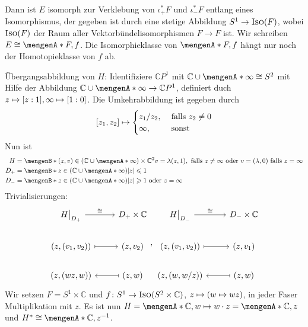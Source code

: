 Dann ist $E$ isomorph zur Verklebung von $\iota_+^*F$ und $\iota_-^* F$ entlang eines Isomorphismus, der gegeben ist durch eine stetige Abbildung $S^1 \to \textsc{Iso}(F)$, 
wobei $\textsc{Iso}(F)$ der Raum aller Vektorbündelisomorphismen $F \to F$ ist. Wir schreiben $E \cong \set{F,f}$. Die Isomorphieklasse von $\set{F,f}$ hängt nur noch der 
Homotopieklasse von $f$ ab.

Übergangsabbildung von $H$: Identifiziere $\mathds{C}P^1$ mit $\mathds{C} \cup \set{\infty} \cong S^2 $ mit Hilfe der Abbildung 
$\mathds{C} \cup \set{\infty} \to \mathds{C}P^1 $, definiert duch $z \mapsto \benbrace*{z:1}, \infty \mapsto \benbrace*{1:0}$. Die Umkehrabbildung ist gegeben durch
\[
	\benbrace*{z_1,z_2} \mapsto \begin{cases}
		z_1/z_2, &\text{ falls }z_2 \not=0\\
		\infty , & \text{ sonst}
	\end{cases}
\]
Nun ist
\begin{align*}
	H &= \set[(z,v) \in (\mathds{C} \cup \set{\infty}) \times \mathds{C}^2]{v= \lambda(z,1), \text{ falls } z \not= \infty \text{ oder } v=(\lambda,0) \text{ falls } 
	z=\infty} \\
	D_+ &= \set[z \in (\mathds{C} \cup \set{\infty})]{\abs*{z} \le 1 } \\
	D_- &= \set[z \in (\mathds{C} \cup \set{\infty})]{ \abs*{z} \ge 1 \text{ oder } z= \infty }  
\end{align*}
Trivialisierungen:
\[
	\begin{tikzcd}
		H\big|_{D_+} \rar["\cong"] & D_+ \times \mathds{C} \\
		(z, (v_1,v_2)) \rar[mapsto] & (z,v_2) \\
		(z,(wz,w)) & (z,w) \lar[mapsto]
	\end{tikzcd}
	, 
	\begin{tikzcd}
		H\big|_{D_-} \rar["\cong"] & D_- \times \mathds{C} \\
		(z, (v_1,v_2)) \rar[mapsto] & (z,v_1) \\
		(z,(w,w/z)) & (z,w) \lar[mapsto]
	\end{tikzcd}
\]
Wir setzen $F=S^1  \times \mathds{C}$ und $f \colon S^1 \to \textsc{Iso}(S^2 \times \mathds{C})$, $z \mapsto \enbrace*{w \mapsto wz}$, in jeder Faser Multiplikation 
mit $z$. Es ist nun $H= \set{\mathds{C}, w \mapsto w \cdot z} = \set{\mathds{C},z} $ und $H^* \cong \set{\mathds{C},z ^{-1}}$.

